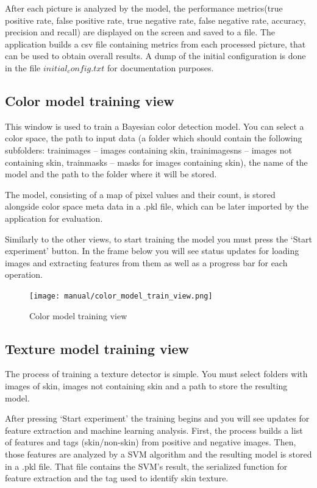 \documentclass[12pt]{report}
\begin{document}
	After each picture is analyzed by the model, the performance metrics(true positive rate, false positive rate, true negative rate, false negative rate, accuracy, precision and recall) are displayed on the screen and saved to a file.
	The application builds a csv file containing metrics from each processed picture, that can be used to obtain overall results. A dump of the initial configuration is done in the file $initial_config.txt$ for documentation purposes.
	
	\subsection{Color model training view}
	This window is used to train a Bayesian color detection model. You can select a color space, the path to input data (a folder which should contain the following subfolders: train\textunderscore images – images containing skin, train\textunderscore images\textunderscore ns – images not containing skin, train\textunderscore masks – masks for images containing skin), the name of the model and the path to the folder where it will be stored. 
	
	The model, consisting of a map of pixel values and their count, is stored alongside color space meta data in a .pkl file, which can be later imported by the application for evaluation.
	
	Similarly to the other views, to start training the model you must press the ‘Start experiment’ button. In the frame below you will see status updates for loading images and extracting features from them as well as a progress bar for each operation.
	
	\begin{figure}[h!]
		\centering
		\texttt{[image: manual/color\_model\_train\_view.png]}
		\caption{Color model training view}
	\end{figure}
	
	\subsection{Texture model training view}
	The process of training a texture detector is simple. You must select folders with images of skin, images not containing skin and a path to store the resulting model.
	
	After pressing ‘Start experiment’ the training begins and you will see updates for feature extraction and machine learning analysis. First, the process builds a list of features and tags (skin/non-skin) from positive and negative images. Then, those features are analyzed by a SVM algorithm and the resulting model is stored in a .pkl file. That file contains the SVM's result, the serialized function for feature extraction and the tag used to identify skin texture.
	
\end{document}
